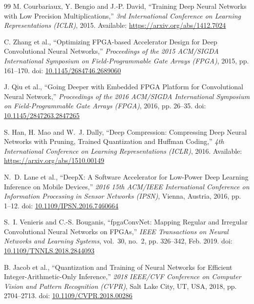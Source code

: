 \documentclass{article}
\begin{document}
\begin{thebibliography}{99}
M. Courbariaux, Y. Bengio and J.-P. David,
``Training Deep Neural Networks with Low Precision Multiplications,''
\textit{3rd International Conference on Learning Representations (ICLR)},
2015.
Available: \url{https://arxiv.org/abs/1412.7024}

C. Zhang et al.,
``Optimizing FPGA-based Accelerator Design for Deep Convolutional Neural
Networks,''
\textit{Proceedings of the 2015 ACM/SIGDA International Symposium on
Field-Programmable Gate Arrays (FPGA)},
2015, pp. 161--170.
doi: \href{https://doi.org/10.1145/2684746.2689060}
{10.1145/2684746.2689060}

J. Qiu et al.,
``Going Deeper with Embedded FPGA Platform for Convolutional Neural Network,''
\textit{Proceedings of the 2016 ACM/SIGDA International Symposium on
Field-Programmable Gate Arrays (FPGA)},
2016, pp. 26--35.
doi: \href{https://doi.org/10.1145/2847263.2847265}
{10.1145/2847263.2847265}

S. Han, H. Mao and W.~J. Dally,
``Deep Compression: Compressing Deep Neural Networks with Pruning, Trained
Quantization and Huffman Coding,''
\textit{4th International Conference on Learning Representations (ICLR)},
2016.
Available: \url{https://arxiv.org/abs/1510.00149}

N.~D. Lane et al.,
``DeepX: A Software Accelerator for Low-Power Deep Learning Inference on
Mobile Devices,''
\textit{2016 15th ACM/IEEE International Conference on Information Processing
in Sensor Networks (IPSN)},
Vienna, Austria, 2016, pp. 1--12.
doi: \href{https://doi.org/10.1109/IPSN.2016.7460664}
{10.1109/IPSN.2016.7460664}

S.~I. Venieris and C.-S. Bouganis,
``fpgaConvNet: Mapping Regular and Irregular Convolutional Neural Networks
on FPGAs,''
\textit{IEEE Transactions on Neural Networks and Learning Systems},
vol.~30, no.~2, pp. 326--342, Feb. 2019.
doi: \href{https://doi.org/10.1109/TNNLS.2018.2844093}
{10.1109/TNNLS.2018.2844093}

B. Jacob et al.,
``Quantization and Training of Neural Networks for Efficient
Integer-Arithmetic-Only Inference,''
\textit{2018 IEEE/CVF Conference on Computer Vision and Pattern Recognition
(CVPR)}, Salt Lake City, UT, USA, 2018, pp. 2704--2713.
doi: \href{https://doi.org/10.1109/CVPR.2018.00286}
{10.1109/CVPR.2018.00286}

\end{thebibliography}
\end{document}
